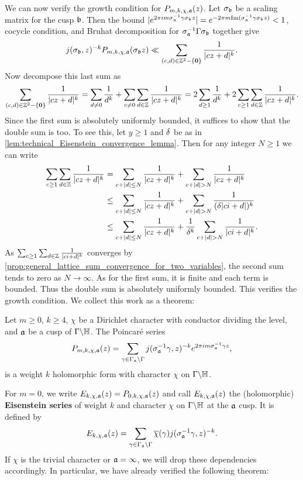     We can now verify the growth condition for $P_{m,k,\chi,\mathfrak{a}}(z)$. Let $\sigma_{\mathfrak{b}}$ be a scaling matrix for the cusp $\mathfrak{b}$. Then the bound $|e^{2\pi im\sigma_{\mathfrak{a}}^{-1}\gamma\sigma_{\mathfrak{b}}z}| = e^{-2\pi m\mathrm{Im}(\sigma_{\mathfrak{a}}^{-1}\gamma\sigma_{\mathfrak{b}}z)} < 1$, cocycle condition, and Bruhat decomposition for $\sigma_{\mathfrak{a}}^{-1}\Gamma\sigma_{\mathfrak{b}}$ together give
    \[
      j(\sigma_{\mathfrak{b}},z)^{-k}P_{m,k,\chi,\mathfrak{a}}(\sigma_{\mathfrak{b}}z) \ll \sum_{(c,d) \in \mathbb{Z}^{2}-\{\mathbf{0}\}}\frac{1}{|cz+d|^{k}}.
    \]
    Now decompose this last sum as
    \[
      \sum_{(c,d) \in \mathbb{Z}^{2}-\{\mathbf{0}\}}\frac{1}{|cz+d|^{k}} = \sum_{d \neq 0}\frac{1}{d^{k}}+\sum_{c \neq 0}\sum_{d \in \mathbb{Z}}\frac{1}{|cz+d|^{k}} = 2\sum_{d \ge 1}\frac{1}{d^{k}}+2\sum_{c \ge 1}\sum_{d \in \mathbb{Z}}\frac{1}{|cz+d|^{k}}.
    \]
    Since the first sum is absolutely uniformly bounded, it suffices to show that the double sum is too. To see this, let $y \ge 1$ and $\delta$ be as in \cref{lem:technical_Eisenstein_convergence_lemma}. Then for any integer $N \ge 1$ we can write
    \begin{align*}
      \sum_{c \ge 1}\sum_{d \in \mathbb{Z}}\frac{1}{|cz+d|^{k}} &= \sum_{c+|d| \le N}\frac{1}{|cz+d|^{k}}+\sum_{c+|d| > N}\frac{1}{|cz+d|^{k}} \\
      &\le \sum_{c+|d| \le N}\frac{1}{|cz+d|^{k}}+\sum_{c+|d| > N}\frac{1}{(\delta|ci+d|)^{k}} \\
      &\le \sum_{c+|d| \le N}\frac{1}{|cz+d|^{k}}+\frac{1}{\delta^{k}}\sum_{c+|d| > N}\frac{1}{|ci+d|^{k}}.
    \end{align*}
    As $\sum_{c \ge 1}\sum_{d \in \mathbb{Z}}\frac{1}{|ci+d|^{k}}$ converges by \cref{prop:general_lattice_sum_convergence_for_two_variables}, the second sum tends to zero as $N \to \infty$. As for the first sum, it is finite and each term is bounded. Thus the double sum is absolutely uniformly bounded. This verifies the growth condition. We collect this work as a theorem:

    \begin{theorem}
      Let $m \ge 0$, $k \ge 4$, $\chi$ be a Dirichlet character with conductor dividing the level, and $\mathfrak{a}$ be a cusp of $\Gamma\backslash\mathbb{H}$. The Poincar\'e series
      \[
        P_{m,k,\chi,\mathfrak{a}}(z) = \sum_{\gamma \in \Gamma_{\mathfrak{a}}\backslash\Gamma}j(\sigma_{\mathfrak{a}}^{-1}\gamma,z)^{-k}e^{2\pi im\sigma_{\mathfrak{a}}^{-1}\gamma z},
      \]
      is a weight $k$ holomorphic form with character $\chi$ on $\Gamma\backslash\mathbb{H}$.
    \end{theorem}
    
    For $m = 0$, we write $E_{k,\chi,\mathfrak{a}}(z) = P_{0,k,\chi,\mathfrak{a}}(z)$ and call $E_{k,\chi,\mathfrak{a}}(z)$ the (holomorphic) \textbf{Eisenstein series} of weight $k$ and character $\chi$ on $\Gamma\backslash\mathbb{H}$ at the $\mathfrak{a}$ cusp. It is defined by
    \[
      E_{k,\chi,\mathfrak{a}}(z) = \sum_{\gamma \in \Gamma_{\mathfrak{a}}\backslash\Gamma}\overline{\chi}(\gamma)j(\sigma_{\mathfrak{a}}^{-1}\gamma,z)^{-k}.
    \]
    If $\chi$ is the trivial character or $\mathfrak{a} = \infty$, we will drop these dependencies accordingly. In particular, we have already verified the following theorem:

